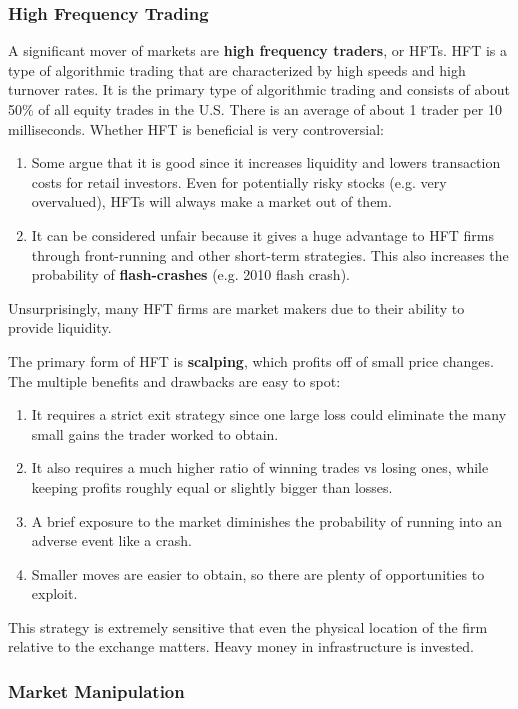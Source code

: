 \documentclass{article}
\begin{document}
\subsubsection{High Frequency Trading}

A significant mover of markets are \textbf{high frequency traders}, or HFTs. HFT is a type of algorithmic trading that are characterized by high speeds and high turnover rates. It is the primary type of algorithmic trading and consists of about 50\% of all equity trades in the U.S. There is an average of about 1 trader per 10 milliseconds. Whether HFT is beneficial is very controversial: 
\begin{enumerate}
    \item Some argue that it is good since it increases liquidity and lowers transaction costs for retail investors. Even for potentially risky stocks (e.g. very overvalued), HFTs will always make a market out of them. 
    \item It can be considered unfair because it gives a huge advantage to HFT firms through front-running and other short-term strategies. This also increases the probability of \textbf{flash-crashes} (e.g. 2010 flash crash). 
\end{enumerate}
Unsurprisingly, many HFT firms are market makers due to their ability to provide liquidity. 

The primary form of HFT is \textbf{scalping}, which profits off of small price changes. The multiple benefits and drawbacks are easy to spot: 
\begin{enumerate}
    \item It requires a strict exit strategy since one large loss could eliminate the many small gains the trader worked to obtain. 
    \item It also requires a much higher ratio of winning trades vs losing ones, while keeping profits roughly equal or slightly bigger than losses. 
    \item A brief exposure to the market diminishes the probability of running into an adverse event like a crash. 
    \item Smaller moves are easier to obtain, so there are plenty of opportunities to exploit. 
\end{enumerate}
This strategy is extremely sensitive that even the physical location of the firm relative to the exchange matters. Heavy money in infrastructure is invested. 


\subsubsection{Market Manipulation}
\end{document}
